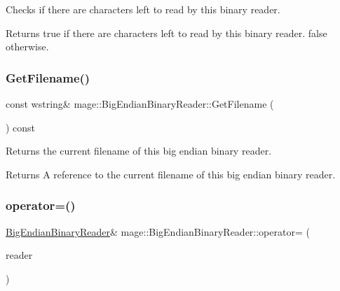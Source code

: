 Checks if there are characters left to read by this binary reader.

\begin{DoxyReturn}{Returns}
{\ttfamily true} if there are characters left to read by this binary reader. {\ttfamily false} otherwise. 
\end{DoxyReturn}
\hypertarget{classmage_1_1_big_endian_binary_reader_a801558f27606dbc681809178aaaaacd1}{}\label{classmage_1_1_big_endian_binary_reader_a801558f27606dbc681809178aaaaacd1} 
\subsubsection{\texorpdfstring{Get\+Filename()}{GetFilename()}}
{\footnotesize\ttfamily const wstring\& mage\+::\+Big\+Endian\+Binary\+Reader\+::\+Get\+Filename (\begin{DoxyParamCaption}{ }\end{DoxyParamCaption}) const\hspace{0.3cm}{\ttfamily [noexcept]}}

Returns the current filename of this big endian binary reader.

\begin{DoxyReturn}{Returns}
A reference to the current filename of this big endian binary reader. 
\end{DoxyReturn}
\hypertarget{classmage_1_1_big_endian_binary_reader_abd4b24df4219469a8c2e9253b1cad405}{}\label{classmage_1_1_big_endian_binary_reader_abd4b24df4219469a8c2e9253b1cad405} 
\subsubsection{\texorpdfstring{operator=()}{operator=()}\hspace{0.1cm}{\footnotesize\ttfamily [1/2]}}
{\footnotesize\ttfamily \hyperlink{classmage_1_1_big_endian_binary_reader}{Big\+Endian\+Binary\+Reader}\& mage\+::\+Big\+Endian\+Binary\+Reader\+::operator= (\begin{DoxyParamCaption}\item[{const \hyperlink{classmage_1_1_big_endian_binary_reader}{Big\+Endian\+Binary\+Reader} \&}]{reader }\end{DoxyParamCaption})\hspace{0.3cm}{\ttfamily [delete]}}

